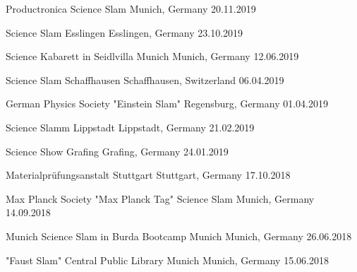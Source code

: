 \begin{cvhonors}
\cvhonor
{Productronica Science Slam} %
{Munich, Germany} %
{} %
{20.11.2019} %

\cvhonor
{Science Slam Esslingen} %
{Esslingen, Germany} %
{} %
{23.10.2019} %

\cvhonor
{Science Kabarett in Seidlvilla Munich} %
{Munich, Germany} %
{} %
{12.06.2019} %

\cvhonor
{Science Slam Schaffhausen} %
{Schaffhausen, Switzerland} %
{} %
{06.04.2019} %

\cvhonor
{German Physics Society "Einstein Slam"} %
{Regensburg, Germany} %
{} %
{01.04.2019} %

\cvhonor
{Science Slamm Lippstadt} %
{Lippstadt, Germany} %
{} %
{21.02.2019} %

\cvhonor
{Science Show Grafing} %
{Grafing, Germany} %
{} %
{24.01.2019} %

\cvhonor
{Materialprüfungsanstalt Stuttgart} %
{Stuttgart, Germany} %
{} %
{17.10.2018} %

\cvhonor
{Max Planck Society "Max Planck Tag" Science Slam} %
{Munich, Germany} %
{} %
{14.09.2018} %

\cvhonor
{Munich Science Slam in Burda Bootcamp Munich} %
{Munich, Germany} %
{} %
{26.06.2018} %

\cvhonor
{"Faust Slam" Central Public Library Munich} %
{Munich, Germany} %
{} %
{15.06.2018} %


\end{cvhonors}
